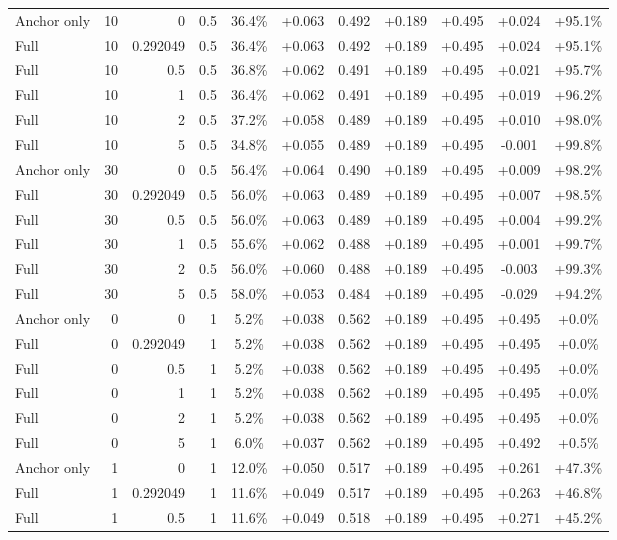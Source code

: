 \begin{table}[htbp]
\begin{tabular}{lrrrccccccc}
Anchor only & 10 & 0 & 0.5 & 36.4\% & +0.063 & 0.492 & +0.189 & +0.495 & +0.024 & +95.1\% \\
Full & 10 & 0.292049 & 0.5 & 36.4\% & +0.063 & 0.492 & +0.189 & +0.495 & +0.024 & +95.1\% \\
Full & 10 & 0.5 & 0.5 & 36.8\% & +0.062 & 0.491 & +0.189 & +0.495 & +0.021 & +95.7\% \\
Full & 10 & 1 & 0.5 & 36.4\% & +0.062 & 0.491 & +0.189 & +0.495 & +0.019 & +96.2\% \\
Full & 10 & 2 & 0.5 & 37.2\% & +0.058 & 0.489 & +0.189 & +0.495 & +0.010 & +98.0\% \\
Full & 10 & 5 & 0.5 & 34.8\% & +0.055 & 0.489 & +0.189 & +0.495 & -0.001 & +99.8\% \\
Anchor only & 30 & 0 & 0.5 & 56.4\% & +0.064 & 0.490 & +0.189 & +0.495 & +0.009 & +98.2\% \\
Full & 30 & 0.292049 & 0.5 & 56.0\% & +0.063 & 0.489 & +0.189 & +0.495 & +0.007 & +98.5\% \\
Full & 30 & 0.5 & 0.5 & 56.0\% & +0.063 & 0.489 & +0.189 & +0.495 & +0.004 & +99.2\% \\
Full & 30 & 1 & 0.5 & 55.6\% & +0.062 & 0.488 & +0.189 & +0.495 & +0.001 & +99.7\% \\
Full & 30 & 2 & 0.5 & 56.0\% & +0.060 & 0.488 & +0.189 & +0.495 & -0.003 & +99.3\% \\
Full & 30 & 5 & 0.5 & 58.0\% & +0.053 & 0.484 & +0.189 & +0.495 & -0.029 & +94.2\% \\
Anchor only & 0 & 0 & 1 & 5.2\% & +0.038 & 0.562 & +0.189 & +0.495 & +0.495 & +0.0\% \\
Full & 0 & 0.292049 & 1 & 5.2\% & +0.038 & 0.562 & +0.189 & +0.495 & +0.495 & +0.0\% \\
Full & 0 & 0.5 & 1 & 5.2\% & +0.038 & 0.562 & +0.189 & +0.495 & +0.495 & +0.0\% \\
Full & 0 & 1 & 1 & 5.2\% & +0.038 & 0.562 & +0.189 & +0.495 & +0.495 & +0.0\% \\
Full & 0 & 2 & 1 & 5.2\% & +0.038 & 0.562 & +0.189 & +0.495 & +0.495 & +0.0\% \\
Full & 0 & 5 & 1 & 6.0\% & +0.037 & 0.562 & +0.189 & +0.495 & +0.492 & +0.5\% \\
Anchor only & 1 & 0 & 1 & 12.0\% & +0.050 & 0.517 & +0.189 & +0.495 & +0.261 & +47.3\% \\
Full & 1 & 0.292049 & 1 & 11.6\% & +0.049 & 0.517 & +0.189 & +0.495 & +0.263 & +46.8\% \\
Full & 1 & 0.5 & 1 & 11.6\% & +0.049 & 0.518 & +0.189 & +0.495 & +0.271 & +45.2\% \\

\end{tabular}
\end{table}
